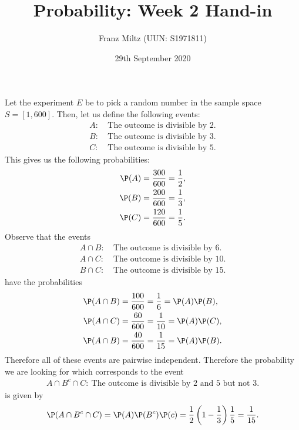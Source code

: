 \documentclass{article}
\begin{document}
\title{Probability: Week 2 Hand-in}
\author{Franz Miltz (UUN: S1971811)}
\date{29th September 2020}
\maketitle
\noindent Let the experiment $E$ be to pick a random number in the sample space
$S=[1,600]$. Then, let us define the following events:
\begin{align*}
  A:\: & \text{The outcome is divisible by 2.} \\
  B:\: & \text{The outcome is divisible by 3.} \\
  C:\: & \text{The outcome is divisible by 5.}
\end{align*}
This gives us the following probabilities:
\begin{align*}
  \P(A)=\frac{300}{600}=\frac{1}{2}, \\
  \P(B)=\frac{200}{600}=\frac{1}{3}, \\
  \P(C)=\frac{120}{600}=\frac{1}{5}.
\end{align*}
Observe that the events
\begin{align*}
  A\cap B:\: & \text{The outcome is divisible by 6.}  \\
  A\cap C:\: & \text{The outcome is divisible by 10.} \\
  B\cap C:\: & \text{The outcome is divisible by 15.}
\end{align*}
have the probabilities
\begin{align*}
  \P(A\cap B) & =\frac{100}{600}=\frac{1}{6}=\P(A)\P(B), \\
  \P(A\cap C) & =\frac{60}{600}=\frac{1}{10}=\P(A)\P(C), \\
  \P(A\cap B) & =\frac{40}{600}=\frac{1}{15}=\P(A)\P(B).
\end{align*}
Therefore all of these events are pairwise independent. Therefore the
probability we are looking for which corresponds to the event
\begin{align*}
  A\cap B^c \cap C:\:\text{The outcome is divisible by 2 and 5 but not 3.}
\end{align*}
is given by
\begin{align*}
  \P(A\cap B^c\cap C)= \P(A)\P(B^c)\P(c) = \frac{1}{2}\left(1-\frac{1}{3}\right)\frac{1}{5}=\frac{1}{15}.
\end{align*}
\end{document}
